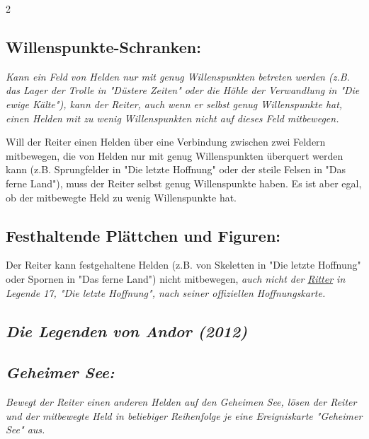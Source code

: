 \documentclass[10pt, a4paper, oneside]{book}
\newcommand{\fan}[1]{\textit{#1}}
\begin{document}
\begin{multicols*}{2}
\begin{nobgcolor}
\subsection{Willenspunkte-Schranken:}

\fan{Kann ein Feld von Helden nur mit genug Willenspunkten betreten werden (z.B. das Lager der Trolle in "Düstere Zeiten" oder die Höhle der Verwandlung in "Die ewige Kälte"), kann der Reiter, auch wenn er selbst genug Willenspunkte hat, einen Helden mit zu wenig Willenspunkten nicht auf dieses Feld mitbewegen.}

Will der Reiter einen Helden über eine Verbindung zwischen zwei Feldern mitbewegen, die von Helden nur mit genug Willenspunkten überquert werden kann (z.B. Sprungfelder in "Die letzte Hoffnung"\supercite{dlh-begleitheft,dlh-faq} oder der steile Felsen in "Das ferne Land"\supercite{dfl-begleitheft,dfl2-erkungsungskarte-555}), muss der Reiter selbst genug Willenspunkte haben. Es ist aber egal, ob der mitbewegte Held zu wenig Willenspunkte hat.




\subsection{Festhaltende Plättchen und Figuren:}

Der Reiter kann festgehaltene Helden (z.B. von Skeletten in "Die letzte Hoffnung" oder Spornen in "Das ferne Land") nicht mitbewegen,\supercite{49724,127533} \fan{auch nicht der \hyperref[ritter]{\fan{Ritter}} in Legende 17, "Die letzte Hoffnung", nach seiner offiziellen Hoffnungskarte.}





\end{nobgcolor}








\begin{bgcolor}
\section{\fan{Die Legenden von Andor (2012)}}


\subsection{\fan{Geheimer See:}}

\fan{Bewegt der Reiter einen anderen Helden auf den Geheimen See, lösen der Reiter und der mitbewegte Held in beliebiger Reihenfolge je eine Ereigniskarte "Geheimer See" aus.}




\end{bgcolor}
\end{multicols*}
\end{document}
